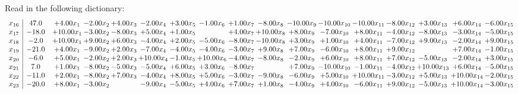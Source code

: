 \documentclass[9pt]{article}
\begin{document}
Read in the following dictionary:
\[\begin{array}{c| c c@{\hskip 2pt} c@{\hskip 2pt} c@{\hskip 2pt} c@{\hskip 2pt} c@{\hskip 2pt} c@{\hskip 2pt} c@{\hskip 2pt} c@{\hskip 2pt} c@{\hskip 2pt} c@{\hskip 2pt} c@{\hskip 2pt} c@{\hskip 2pt} c@{\hskip 2pt} c@{\hskip 2pt} c@{\hskip 2pt} }
 x_{16}   &  47.0 & +  4.00 x_{1} & -2.00 x_{2} & +  4.00 x_{3} & -2.00 x_{4} & +  3.00 x_{5} & -1.00 x_{6} & +  1.00 x_{7} & -8.00 x_{8} & -10.00 x_{9} & -10.00 x_{10} & -10.00 x_{11} & -8.00 x_{12} & +  3.00 x_{13} & +  6.00 x_{14} & -6.00 x_{15}\\
 x_{17}   &  -18.0 & + 10.00 x_{1} & -3.00 x_{2} & -8.00 x_{3} & +  5.00 x_{4} & +  1.00 x_{5} &   & +  4.00 x_{7} & + 10.00 x_{8} & +  8.00 x_{9} & -7.00 x_{10} & +  8.00 x_{11} & -4.00 x_{12} & -8.00 x_{13} & -3.00 x_{14} & -5.00 x_{15}\\
 x_{18}   &  -2.0 & + 10.00 x_{1} & +  9.00 x_{2} & +  6.00 x_{3} & -4.00 x_{4} & +  2.00 x_{5} & -5.00 x_{6} & -8.00 x_{7} & -10.00 x_{8} & +  3.00 x_{9} & +  1.00 x_{10} & +  4.00 x_{11} & -7.00 x_{12} & +  9.00 x_{13} & -2.00 x_{14} & +  9.00 x_{15}\\
 x_{19}   &  -21.0 & +  4.00 x_{1} & -9.00 x_{2} & +  2.00 x_{3} & -7.00 x_{4} & -4.00 x_{5} & -4.00 x_{6} & -3.00 x_{7} & +  9.00 x_{8} & +  7.00 x_{9} & -6.00 x_{10} & +  8.00 x_{11} & +  9.00 x_{12} &   & +  7.00 x_{14} & -1.00 x_{15}\\
 x_{20}   &  -6.0 & +  5.00 x_{1} & -2.00 x_{2} & +  2.00 x_{3} & + 10.00 x_{4} & -1.00 x_{5} & + 10.00 x_{6} & -4.00 x_{7} & -8.00 x_{8} & -2.00 x_{9} & +  6.00 x_{10} & +  8.00 x_{11} & +  7.00 x_{12} & -5.00 x_{13} & -2.00 x_{14} & +  3.00 x_{15}\\
 x_{21}   &  7.0 & +  1.00 x_{1} & -8.00 x_{2} & -5.00 x_{3} & -5.00 x_{4} & +  6.00 x_{5} & +  3.00 x_{6} & -8.00 x_{7} &   & +  7.00 x_{9} & -10.00 x_{10} & -1.00 x_{11} & -4.00 x_{12} & + 10.00 x_{13} & +  6.00 x_{14} & -5.00 x_{15}\\
 x_{22}   &  -11.0 & +  2.00 x_{1} & -8.00 x_{2} & +  7.00 x_{3} & -4.00 x_{4} & +  8.00 x_{5} & +  5.00 x_{6} & -3.00 x_{7} & -9.00 x_{8} & -6.00 x_{9} & +  5.00 x_{10} & + 10.00 x_{11} & -3.00 x_{12} & +  5.00 x_{13} & + 10.00 x_{14} & -2.00 x_{15}\\
 x_{23}   &  -20.0 & +  8.00 x_{1} & -3.00 x_{2} &   & -9.00 x_{4} & -5.00 x_{5} & +  4.00 x_{6} & +  7.00 x_{7} & +  1.00 x_{8} & -4.00 x_{9} & +  4.00 x_{10} & -6.00 x_{11} & +  9.00 x_{12} & -5.00 x_{13} & + 10.00 x_{14} & -3.00 x_{15}\\

\end{array}\]
\end{document}
